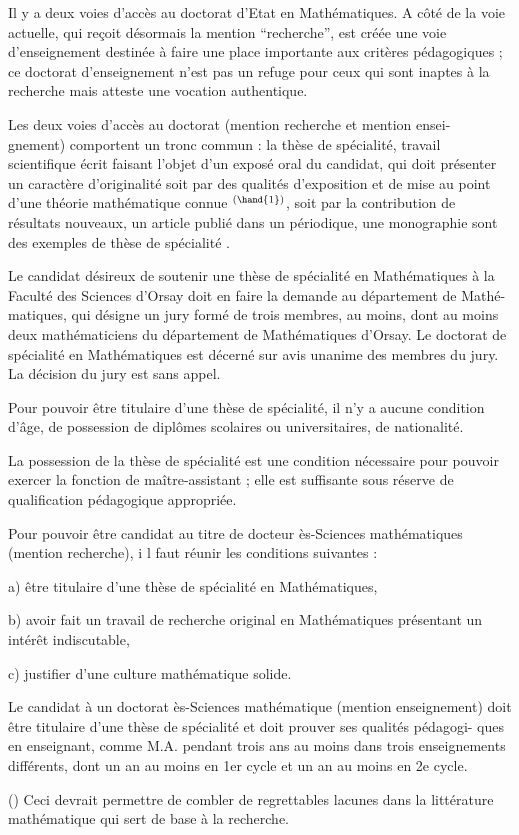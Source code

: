 Il y a deux voies d'accès au doctorat d'Etat en Mathématiques.
A côté de la voie actuelle, qui reçoit désormais la mention ``recherche'',
est créée une voie d'enseignement destinée à faire une place importante aux critères
pédagogiques ; ce doctorat d'enseignement n'est pas un refuge pour ceux qui sont
inaptes à la recherche mais atteste une vocation authentique.

Les deux voies d'accès au doctorat (mention recherche et mention ensei-%
gnement) comportent un tronc commun : la thèse de spécialité, travail scientifique
écrit faisant l'objet d'un exposé oral du candidat, qui doit présenter un caractère
d'originalité soit par des qualités d'exposition et de mise au point d'une théorie
mathématique connue $^{(\hand{1})}$, soit par la contribution de résultats nouveaux, un article
publié dans un périodique, une monographie sont des exemples de thèse de spécialité .

Le candidat désireux de soutenir une thèse de spécialité en Mathématiques
à la Faculté des Sciences d'Orsay doit en faire la demande au département de Mathé-%
matiques, qui désigne un jury formé de trois membres, au moins, dont au moins deux
mathématiciens du département de Mathématiques d'Orsay. Le doctorat de spécialité
en Mathématiques est décerné sur avis unanime des membres du jury. La décision du
jury est sans appel.

Pour pouvoir être titulaire d'une thèse de spécialité, il n'y a aucune
condition d'âge, de possession de diplômes scolaires ou universitaires, de nationalité.

La possession de la thèse de spécialité est une condition nécessaire pour
pouvoir exercer la fonction de maître-assistant ; elle est suffisante sous réserve
de qualification pédagogique appropriée.

Pour pouvoir être candidat au titre de docteur ès-Sciences mathématiques
(mention recherche), i l faut réunir les conditions suivantes :

a) être titulaire d'une thèse de spécialité en Mathématiques,

b) avoir fait un travail de recherche original en Mathématiques présentant
un intérêt indiscutable,

c) justifier d'une culture mathématique solide.

Le candidat à un doctorat ès-Sciences mathématique (mention enseignement)
doit être titulaire d'une thèse de spécialité et doit prouver ses qualités pédagogi-%
ques en enseignant, comme M.A. pendant trois ans au moins dans trois enseignements
différents, dont un an au moins en 1er cycle et un an au moins en 2e cycle.

() Ceci devrait permettre de combler de regrettables lacunes dans la littérature
mathématique qui sert de base à la recherche.


